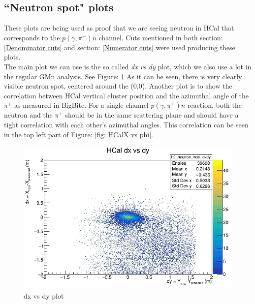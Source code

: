 \subsection{``Neutron spot" plots}
These plots are being used as proof that we are seeing neutron in HCal that corresponds to the $p(\gamma,\pi^+)n$ channel. Cuts mentioned in both section: \ref{Denominator cuts} and section: \ref{Numerator cuts} were used producing these plots.\\
The main plot we can use is the so called \textit{dx vs dy} plot, which we also use a lot in the regular GMn analysis. See Figure: \ref{fig: dx vs dy} As it can be seen, there is very clearly visible neutron spot, centered around the (0,0). Another plot is to show the correlation between HCal vertical cluster position and the azimuthal angle of the $\pi^+$ as measured in BigBite. For a single channel $p(\gamma,\pi^+)n$ reaction, both the neutron and the $\pi^+$ should be in the same scattering plane and should have a tight correlation with each other's azimuthal angles. This correlation can be seen in the top left part of Figure: \ref{fig: HCalX vs phi}.

\begin{figure}[h!]
    \centering
    \includegraphics{Images/sbs9_hydrogen_analysis/dx_vs_dy.png}
    \caption{dx vs dy plot}
    \label{fig: dx vs dy}
\end{figure}

